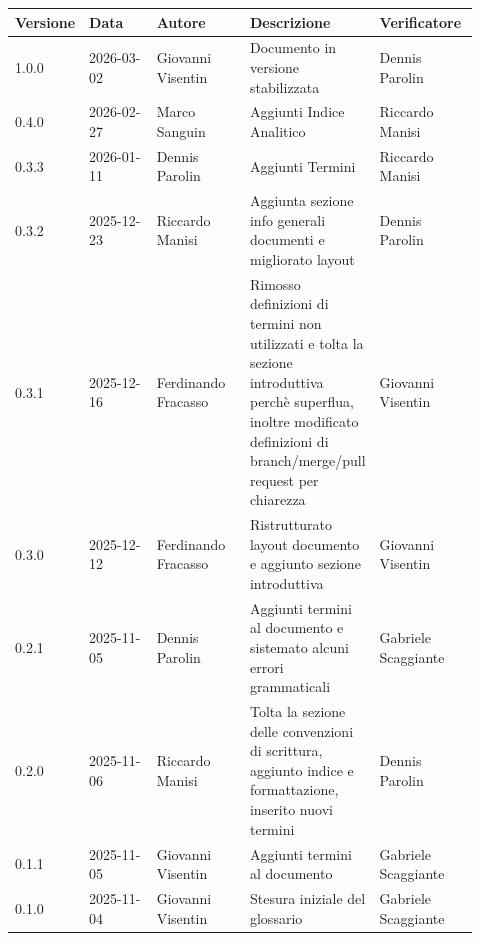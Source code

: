 \documentclass[a4paper,12pt]{article}
\begin{document}
\begin{center}
\small
\renewcommand{\arraystretch}{1.2} 
\begin{tabular}{|p{0.1\linewidth}|p{0.18\linewidth}|p{0.22\linewidth}|p{0.20\linewidth}|p{0.22\linewidth}|}
\hline
\rowcolor{gray!60} 
\textbf{Versione} & \textbf{Data} & \textbf{Autore} & \textbf{Descrizione} & \textbf{Verificatore} \\
\hline
\rowcolor{white}
1.0.0 & 2026-03-02 & Giovanni Visentin & Documento in versione stabilizzata & Dennis Parolin \\
\hline
\rowcolor{gray!20}
0.4.0 & 2026-02-27 & Marco Sanguin & Aggiunti Indice Analitico & Riccardo Manisi \\
\hline
\rowcolor{white}
0.3.3 & 2026-01-11 & Dennis Parolin & Aggiunti Termini & Riccardo Manisi \\
\hline
\rowcolor{gray!20}
0.3.2 & 2025-12-23 & Riccardo Manisi & Aggiunta sezione info generali documenti e migliorato layout & Dennis Parolin\\
\hline
\rowcolor{white}
0.3.1 & 2025-12-16 & Ferdinando Fracasso & Rimosso definizioni di termini non utilizzati e tolta la sezione introduttiva perchè superflua, inoltre modificato definizioni di branch/merge/pull request per chiarezza & Giovanni Visentin\\
\hline
\rowcolor{gray!20}
0.3.0 & 2025-12-12 & Ferdinando Fracasso & Ristrutturato layout documento e aggiunto sezione introduttiva & Giovanni Visentin\\
\hline
\rowcolor{white}
0.2.1 & 2025-11-05 & Dennis Parolin & Aggiunti termini al documento e sistemato alcuni errori grammaticali & Gabriele Scaggiante \\
\hline
\rowcolor{gray!20}
0.2.0 & 2025-11-06 & Riccardo Manisi & Tolta la sezione delle convenzioni di scrittura, aggiunto indice e formattazione, inserito nuovi termini & Dennis Parolin \\
\hline
\rowcolor{white}
0.1.1 & 2025-11-05 & Giovanni Visentin & Aggiunti termini al documento & Gabriele Scaggiante \\
\hline
\rowcolor{gray!20}
0.1.0 & 2025-11-04 & Giovanni Visentin & Stesura iniziale del glossario & Gabriele Scaggiante \\
\hline
\end{tabular}
\end{center}

\clearpage

\tableofcontents
\thispagestyle{empty} %
\clearpage
\end{document}
